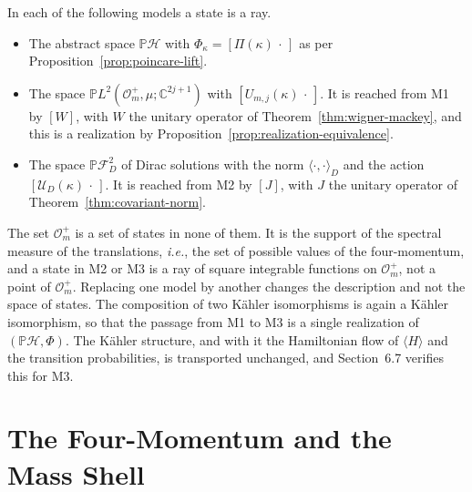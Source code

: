 \begin{remark}\label{rem:three-models}
	In each of the following models a state is a ray.
	\begin{itemize}
		\item[M1.] The abstract space $\mathbb{P}\mathcal{H}$ with $\Phi_\kappa=[\Pi(\kappa)\,\cdot\,]$ as per Proposition~\ref{prop:poincare-lift}.
		\item[M2.] The space $\mathbb{P}L^2(\mathcal{O}_m^+,\mu;\mathbb{C}^{2j+1})$ with $[U_{m,j}(\kappa)\,\cdot\,]$. It is reached from M1 by $[W]$, with $W$ the unitary operator of Theorem~\ref{thm:wigner-mackey}, and this is a realization by Proposition~\ref{prop:realization-equivalence}.
		\item[M3.] The space $\mathbb{P}\mathcal{F}_D^2$ of Dirac solutions with the norm $\langle\cdot,\cdot\rangle_D$ and the action $[\mathcal{U}_D(\kappa)\,\cdot\,]$. It is reached from M2 by $[J]$, with $J$ the unitary operator of Theorem~\ref{thm:covariant-norm}.
	\end{itemize}
	The set $\mathcal{O}_m^+$ is a set of states in none of them. It is the support of the spectral measure of the translations, \textit{i.e.}, the set of possible values of the four-momentum, and a state in M2 or M3 is a ray of square integrable functions on $\mathcal{O}_m^+$, not a point of $\mathcal{O}_m^+$. Replacing one model by another changes the description and not the space of states. The composition of two Kähler isomorphisms is again a Kähler isomorphism, so that the passage from M1 to M3 is a single realization of $(\mathbb{P}\mathcal{H},\Phi)$. The Kähler structure, and with it the Hamiltonian flow of $\langle H\rangle$ and the transition probabilities, is transported unchanged, and Section~6.7 verifies this for M3.
\end{remark}

\section{The Four-Momentum and the Mass Shell}
\label{sec:poincare-spectral}


